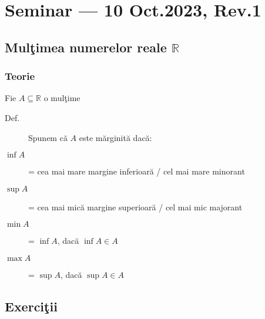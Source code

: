 \documentclass[a4paper, 12pt, notitlepage]{book}
\begin{document}


    \newcommand\revstr{Rev.\@ 1}
    \chapter{Seminar --- 10 Oct.\@ 2023, \revstr}

    \section{Mul\c{t}imea numerelor reale $\mathbb{R}$}
    \subsection{Teorie}
    Fie $A \subseteq \mathbb{R}$ o mul\c{t}ime
    \begin{description}
      \item[Def.] Spunem c\u{a} $A$ este m\u{a}rginit\u{a} dac\u{a}:
      \item[$\inf A$] = cea mai mare margine inferioar\u{a} / cel mai mare minorant
      \item[$\sup A$] = cea mai mic\u{a} margine superioar\u{a} / cel mai mic majorant
      \item[$\min A$] = $\inf A$, dac\u{a} $\inf A \in A$
      \item[$\max A$] = $\sup A$, dac\u{a} $\sup A \in A$
    \end{description}

    \section{Exerci\c{t}ii}
\end{document}
